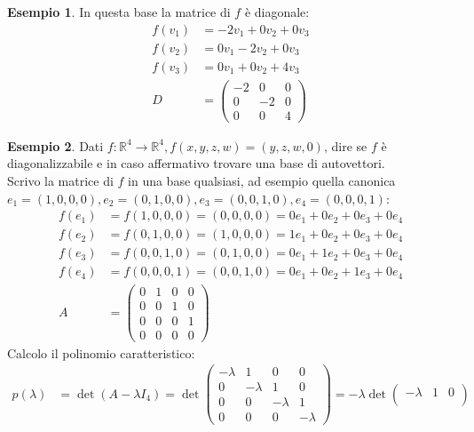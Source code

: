 \documentclass[a4paper]{article}
\theoremstyle{definition}
\newtheorem*{es}{Esempio}
\begin{document}
\begin{es}
		In questa base la matrice di $f$ è diagonale:
		\begin{align*}
			f(v_1) &= - 2v_1 + 0v_2 + 0v_3 \\
			f(v_2) &= 0v_1 - 2v_2 + 0v_3 \\
			f(v_3) &= 0v_1 + 0v_2 + 4v_3 \\
			D &= \begin{pmatrix}
				-2 & 0 & 0 \\
				0 & -2 & 0 \\
				0 & 0 & 4
			\end{pmatrix}
		\end{align*}
	\end{es}

	\begin{es}
		Dati $f: \mathbb{R}^4 \to \mathbb{R}^4, f(x, y, z, w) = (y, z, w, 0)$,
		dire se $f$ è diagonalizzabile e in caso affermativo trovare una base di autovettori. \\
		Scrivo la matrice di $f$ in una base qualsiasi, ad esempio quella canonica $e_1 = (1, 0, 0, 0), e_2 = (0, 1, 0, 0), e_3 = (0, 0, 1, 0), e_4 = (0, 0, 0, 1)$:
		\begin{align*}
			f(e_1) &= f(1, 0, 0, 0) = (0, 0, 0, 0) = 0e_1 + 0e_2 + 0e_3 + 0e_4 \\
			f(e_2) &= f(0, 1, 0, 0) = (1, 0, 0, 0) = 1e_1 + 0e_2 + 0e_3 + 0e_4 \\
			f(e_3) &= f(0, 0, 1, 0) = (0, 1, 0, 0) = 0e_1 + 1e_2 + 0e_3 + 0e_4 \\
			f(e_4) &= f(0, 0, 0, 1) = (0, 0, 1, 0) = 0e_1 + 0e_2 + 1e_3 + 0e_4 \\
			A &= \begin{pmatrix}
				0 & 1 & 0 & 0 \\
				0 & 0 & 1 & 0 \\
				0 & 0 & 0 & 1 \\
				0 & 0 & 0 & 0
			\end{pmatrix}
		\end{align*}
		Calcolo il polinomio caratteristico:
		\begin{align*}
			p(\lambda) &= \det(A - \lambda I_4) = \det \begin{pmatrix}
				- \lambda & 1 & 0 & 0 \\
				0 & - \lambda & 1 & 0 \\
				0 & 0 & - \lambda & 1 \\
				0 & 0 & 0 & - \lambda
			\end{pmatrix} = - \lambda \det \begin{pmatrix}
				- \lambda & 1 & 0 \\

\end{pmatrix}
\end{align*}
\end{es}
\end{document}
